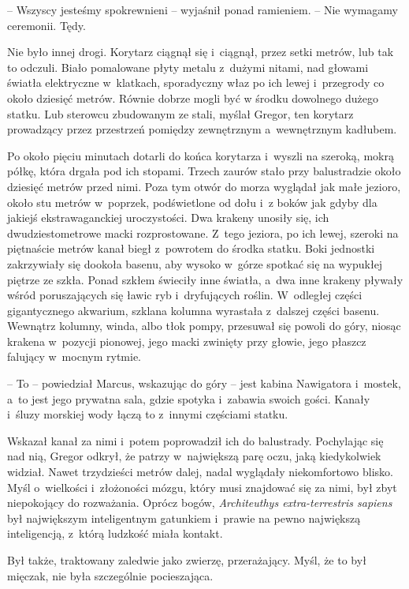 \documentclass[oneside,polish,12pt,sfheadings]{mwbk}
\begin{document}
-- Wszyscy jesteśmy spokrewnieni -- wyjaśnił ponad ramieniem. -- Nie
wymagamy ceremonii. Tędy.

Nie było innej drogi. Korytarz ciągnął się i~ciągnął, przez setki
metrów, lub tak to odczuli. Biało pomalowane płyty metalu z~dużymi
nitami, nad głowami światła elektryczne w~klatkach, sporadyczny właz po
ich lewej i~przegrody co około dziesięć metrów. Równie dobrze mogli być
w środku dowolnego dużego statku. Lub sterowcu zbudowanym ze stali,
myślał Gregor, ten korytarz prowadzący przez przestrzeń pomiędzy
zewnętrznym a~wewnętrznym kadłubem.

Po około pięciu minutach dotarli do końca korytarza i~wyszli na szeroką,
mokrą półkę, która drgała pod ich stopami. Trzech zaurów stało przy
balustradzie około dziesięć metrów przed nimi. Poza tym otwór do morza
wyglądał jak małe jezioro, około stu metrów w~poprzek, podświetlone od
dołu i~z boków jak gdyby dla jakiejś ekstrawaganckiej uroczystości. Dwa
krakeny unosiły się, ich dwudziestometrowe macki rozprostowane. Z~tego
jeziora, po ich lewej, szeroki na piętnaście metrów kanał biegł z~powrotem do środka statku. Boki jednostki zakrzywiały się dookoła
basenu, aby wysoko w~górze spotkać się na wypukłej piętrze ze szkła.
Ponad szkłem świeciły inne światła, a~dwa inne krakeny pływały wśród
poruszających się ławic ryb i~dryfujących roślin. W~odległej części
gigantycznego akwarium, szklana kolumna wyrastała z~dalszej części
basenu. Wewnątrz kolumny, winda, albo tłok pompy, przesuwał się powoli
do góry, niosąc krakena w~pozycji pionowej, jego macki zwinięty przy
głowie, jego płaszcz falujący w~mocnym rytmie.

-- To -- powiedział Marcus, wskazując do góry -- jest kabina Nawigatora i~mostek, a~to jest jego prywatna sala, gdzie spotyka i~zabawia swoich
gości. Kanały i~śluzy morskiej wody łączą to z~innymi częściami statku.

Wskazał kanał za nimi i~potem poprowadził ich do balustrady. Pochylając
się nad nią, Gregor odkrył, że patrzy w~największą parę oczu, jaką
kiedykolwiek widział. Nawet trzydzieści metrów dalej, nadal wyglądały
niekomfortowo blisko. Myśl o~wielkości i~złożoności mózgu, który musi
znajdować się za nimi, był zbyt niepokojący do rozważania. Oprócz bogów,
\emph{Architeuthys extra-terrestris sapiens } był największym
inteligentnym gatunkiem i~prawie na pewno największą inteligencją, z~którą ludzkość miała kontakt.

Był także, traktowany zaledwie jako zwierzę, przerażający. Myśl, że to
był mięczak, nie była szczególnie pocieszająca.
\end{document}
